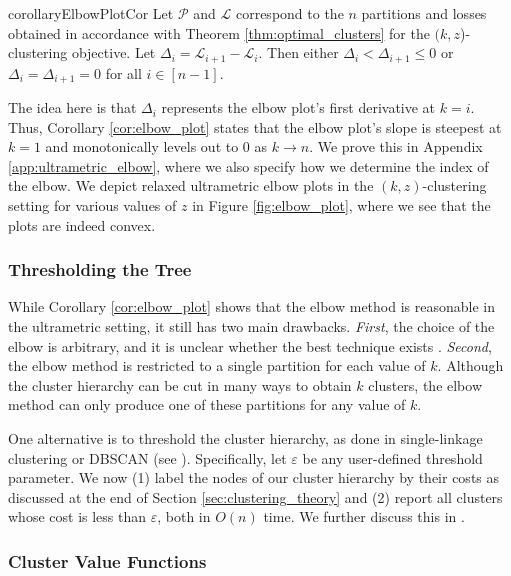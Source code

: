 \begin{restatable}{corollary}{ElbowPlotCor}
    \label{cor:elbow_plot}
    Let $\mathcal{P}$ and $\mathcal{L}$ correspond to the $n$ partitions and losses obtained in accordance with Theorem \ref{thm:optimal_clusters} for the $(k, z$)-clustering objective. Let $\Delta_i = \mathcal{L}_{i+1} - \mathcal{L}_i$. Then either $\Delta_{i} < \Delta_{i+1} \leq 0$ or $\Delta_{i} = \Delta_{i+1} = 0$ for all $i \in [n-1]$.
\end{restatable}

The idea here is that $\Delta_i$ represents the elbow plot's first derivative at $k=i$. Thus, Corollary \ref{cor:elbow_plot} states that the elbow plot's slope is steepest at $k=1$ and monotonically levels out to 0 as $k \rightarrow n$. We prove this in Appendix \ref{app:ultrametric_elbow}, where we also specify how we determine the index of the elbow. We depict relaxed ultrametric elbow plots in the $(k, z)$-clustering setting for various values of $z$ in Figure \ref{fig:elbow_plot}, where we see that the plots are indeed convex.




\subsubsection{Thresholding the Tree}

While Corollary \ref{cor:elbow_plot} shows that the elbow method is reasonable in the ultrametric setting, it still has two main drawbacks. \emph{First}, the choice of the elbow is arbitrary, and it is unclear whether the best technique exists \citep{elbow_issues}. \emph{Second}, the elbow method is restricted to a single partition for each value of $k$. Although the cluster hierarchy can be cut in many ways to obtain $k$ clusters, the elbow method can only produce one of these partitions for any value of $k$.

One alternative is to threshold the cluster hierarchy, as done in single-linkage clustering or DBSCAN (see \citet{hdbscan}). Specifically, let $\varepsilon$ be any user-defined threshold parameter. We now (1) label the nodes of our cluster hierarchy by their costs as discussed at the end of Section \ref{sec:clustering_theory} and (2) report all clusters whose cost is less than $\varepsilon$, both in $O(n)$ time.
We further discuss this in .


\subsubsection{Cluster Value Functions} \label{sec:clustervaluefunction}

